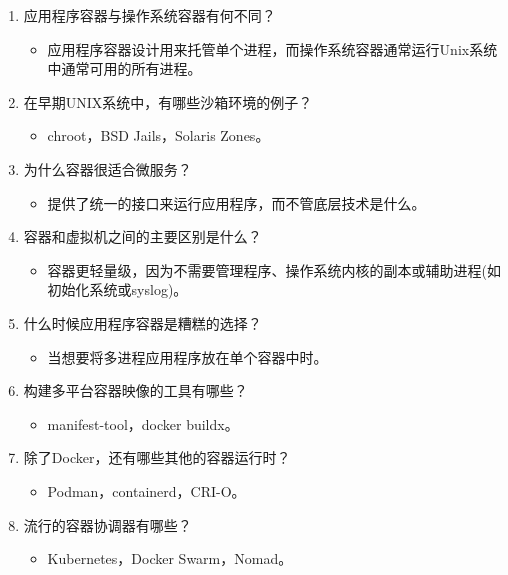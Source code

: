 \begin{enumerate}
\item
应用程序容器与操作系统容器有何不同？
\begin{itemize}
\item 
应用程序容器设计用来托管单个进程，而操作系统容器通常运行Unix系统中通常可用的所有进程。
\end{itemize}

\item
在早期UNIX系统中，有哪些沙箱环境的例子？
\begin{itemize}
\item 
chroot，BSD Jails，Solaris Zones。
\end{itemize}

\item
为什么容器很适合微服务？
\begin{itemize}
\item 
提供了统一的接口来运行应用程序，而不管底层技术是什么。
\end{itemize}

\item
容器和虚拟机之间的主要区别是什么？
\begin{itemize}
\item 
容器更轻量级，因为不需要管理程序、操作系统内核的副本或辅助进程(如初始化系统或syslog)。
\end{itemize}

\item
什么时候应用程序容器是糟糕的选择？
\begin{itemize}
\item 
当想要将多进程应用程序放在单个容器中时。
\end{itemize}

\item
构建多平台容器映像的工具有哪些？
\begin{itemize}
\item 
manifest-tool，docker buildx。
\end{itemize}

\item
除了Docker，还有哪些其他的容器运行时？
\begin{itemize}
\item 
Podman，containerd，CRI-O。
\end{itemize}

\item
流行的容器协调器有哪些？
\begin{itemize}
\item 
Kubernetes，Docker Swarm，Nomad。
\end{itemize}
\end{enumerate}